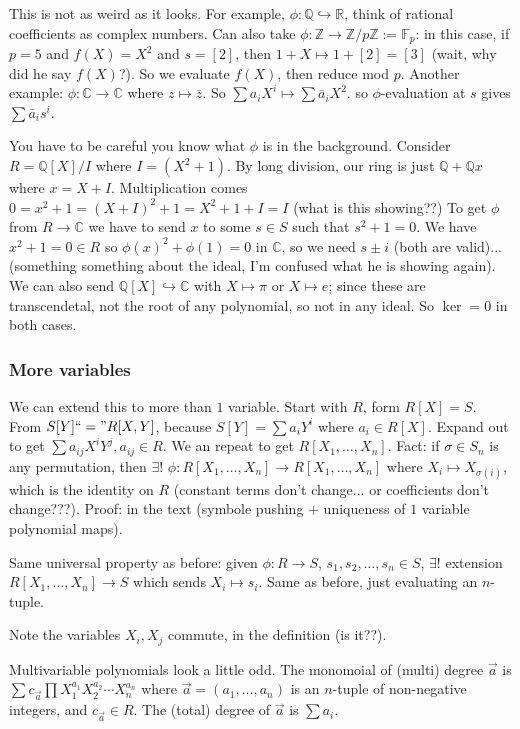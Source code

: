 \documentclass{article}
\theoremstyle{plain}
\theoremstyle{remark}
\newcommand{\Z}{{\mathbb Z}}
\newcommand{\Q}{{\mathbb Q}}
\newcommand{\R}{{\mathbb R}}
\newcommand{\C}{{\mathbb C}}
\begin{document}
This is not as weird as it looks.
For example, $\phi \colon \Q \hookrightarrow \R$,
think of rational coefficients as complex numbers.
Can also take $\phi \colon \Z \to \Z/p\Z := \mathbb{F}_p$:
in this case, if $p = 5$ and $f(X) = X^2$ and $s = [2]$,
then $1 + X \mapsto 1 + [2] = [3]$ (wait, why did he say $f(X)$?).
So we evaluate $f(X)$, then reduce mod $p$.
Another example: $\phi \colon \C \to \C$ where $z \mapsto \bar{z}$.
So $\sum a_i X^i \mapsto \sum \bar{a}_iX^2$.
so $\phi$-evaluation at $s$ gives $\sum \bar{a}_i s^i$.

You have to be careful you know what $\phi$ is in the background.
Consider $R = \Q[X]/I$ where $I = (X^2+1)$.
By long division, our ring is just $\Q + \Q x$ where $x = X + I$.
Multiplication comes $0 = x^2 + 1 = (X+I)^2 + 1 = X^2 + 1 + I = I$
(what is this showing??)
To get $\phi$ from $R \to \C$ we have to send $x$ to some $s \in S$ such that $s^2 + 1 = 0$.
We have $x^2 + 1 = 0 \in R$ so $\phi(x)^2 + \phi(1) = 0$ in $\C$,
so we need $s \pm i$ (both are valid)...
(something something about the ideal, I'm confused what he is showing again).
We can also send $\Q[X] \hookrightarrow \C$ with $X \mapsto \pi$ or $X \mapsto e$;
since these are transcendetal, not the root of any polynomial,
so not in any ideal.
So $\ker = 0$ in both cases.

\subsubsection{More variables}

We can extend this to more than $1$ variable.
Start with $R$, form $R[X] = S$.
From $S[Y] ``=" R[X,Y]$,
because $S[Y] = \sum a_i Y^i$ where $a_i \in R[X]$.
Expand out to get $\sum a_{ij} X^iY^j, a_{ij} \in R$.
We an repeat to get $R[X_1,\dots,X_n]$.
Fact: if $\sigma \in S_n$ is any permutation,
then $\exists!$ $\phi \colon R[X_1,\dots,X_n] \to R[X_1,\dots,X_n]$
where $X_i \mapsto X_{\sigma(i)}$, which is the identity on $R$ (constant terms don't change...
or coefficients don't change???).
Proof: in the text (symbole pushing + uniqueness of $1$ variable polynomial maps).

Same universal property as before:
given $\phi \colon R \to S$, $s_1,s_2,\dots,s_n \in S$, $\exists!$ extension
$R[X_1,\dots,X_n] \to S$ which sends $X_i \mapsto s_i$.
Same as before, just evaluating an $n$-tuple.

Note the variables $X_i,X_j$ commute, in the definition (is it??).

Multivariable polynomials look a little odd.
The monomoial of (multi) degree $\vec{a}$ is
$\sum c_{\vec{a}}\prod X_1^{a_1}X_2^{a_2}\cdots X_n^{a_n}$
where $\vec{a} = (a_1,\dots,a_n)$ is an $n$-tuple of non-negative integers,
and $c_{\vec{a}} \in R$.
The (total) degree of $\vec{a}$ is $\sum a_i$.
\end{document}
